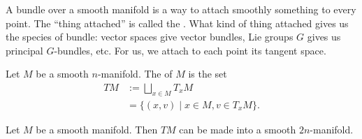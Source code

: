 

\begin{node}
A bundle over a smooth manifold is a way to attach smoothly something
to every point. The ``thing attached'' is called the
. What kind of thing attached gives us the species of
bundle: vector spaces give vector bundles, Lie groups $G$ gives us
principal $G$-bundles, etc. For us, we attach to each point its
tangent space.
\end{node}

\begin{definition}
Let $M$ be a smooth $n$-manifold. The  of $M$
is the set
\begin{subequations}
  \begin{align}
TM & :=\bigsqcup_{x\in M}T_{x}M\\
&=\{(x,v)\mid x\in M, v\in T_{x}M\}.
  \end{align}
\end{subequations}
\end{definition}



\begin{theorem}%
Let $M$ be a smooth manifold. Then $TM$ can be made into a smooth $2n$-manifold.
\end{theorem}

